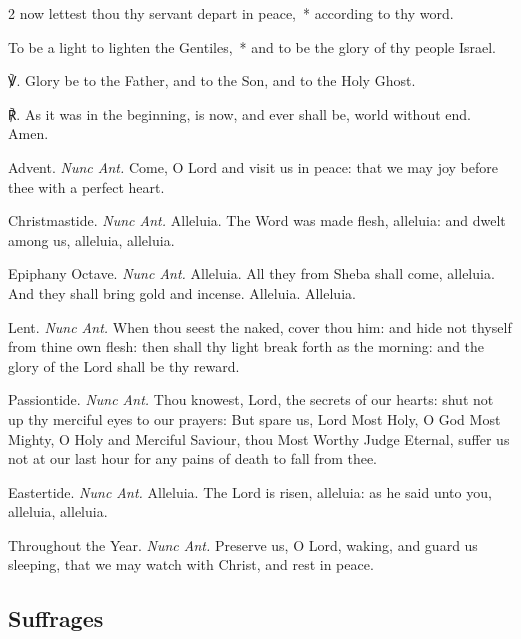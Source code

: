 \begin{multicols}{2}
 {} now lettest thou thy servant depart in peace,~* according to thy word.\par
    To be a light to lighten the Gentiles,~* and to be the glory of thy people Israel.\par
	℣. Glory be to the Father, and to the Son, and to the Holy Ghost.\par
	℟. As it was in the beginning, is now, and ever shall be, world without end. Amen.\\
\par\noindent
{\color{RubricRed}Advent.} \textit{Nunc Ant.} Come, O Lord and visit us in peace: that we may joy before thee with a perfect heart.%
\par\noindent
{\color{RubricRed}Christmastide.} \textit{Nunc Ant.} Alleluia. The Word was made flesh, alleluia: and dwelt among us, alleluia, alleluia.%
\par\noindent
{\color{RubricRed}Epiphany Octave.} \textit{Nunc Ant.} Alleluia. All they from Sheba shall come, alleluia. And they shall bring gold and incense. Alleluia. Alleluia.%
\par\noindent
{\color{RubricRed}Lent.} \textit{Nunc Ant.} When thou seest the naked, cover thou him: and hide not thyself from thine own flesh: then shall thy light break forth as the morning: and the glory of the Lord shall be thy reward.%
\par\noindent
{\color{RubricRed}Passiontide.} \textit{Nunc Ant.} Thou knowest, Lord, the secrets of our hearts: shut not up thy merciful eyes to our prayers: But spare us, Lord Most Holy, O God Most Mighty, O Holy and Merciful Saviour, thou Most Worthy Judge Eternal, suffer us not at our last hour for any pains of death to fall from thee.%
\par\noindent
{\color{RubricRed}Eastertide.} \textit{Nunc Ant.} Alleluia. The Lord is risen, alleluia: as he said unto you, alleluia, alleluia.
\par\noindent
{\color{RubricRed}Throughout the Year.} \textit{Nunc Ant.} Preserve us, O Lord, waking, and guard us sleeping, that we may watch with Christ, and rest in peace.


\subsection{Suffrages}


\end{multicols}
